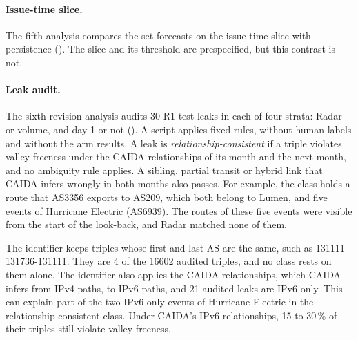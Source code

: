 \paragraph{Issue-time slice.}
The fifth analysis compares the set forecasts on the issue-time slice with persistence ().
The slice and its threshold are prespecified, but this contrast is not.

\paragraph{Leak audit.}
The sixth revision analysis audits 30 R1 test leaks in each of four strata: Radar or volume, and day 1 or not ().
A script applies fixed rules, without human labels and without the arm results.
A leak is \emph{relationship-consistent} if a triple violates valley-freeness under the CAIDA relationships of its month and the next month, and no ambiguity rule applies.
A sibling, partial transit or hybrid link that CAIDA infers wrongly in both months also passes.
For example, the class holds a route that AS3356 exports to AS209, which both belong to Lumen, and five events of Hurricane Electric (AS6939).
The routes of these five events were visible from the start of the look-back, and Radar matched none of them.

The identifier keeps triples whose first and last AS are the same, such as 131111-131736-131111.
They are 4 of the \num{16602} audited triples, and no class rests on them alone.
The identifier also applies the CAIDA relationships, which CAIDA infers from IPv4 paths, to IPv6 paths, and 21 audited leaks are IPv6-only.
This can explain part of the two IPv6-only events of Hurricane Electric in the relationship-consistent class.
Under CAIDA's IPv6 relationships, 15 to 30\,\% of their triples still violate valley-freeness.

